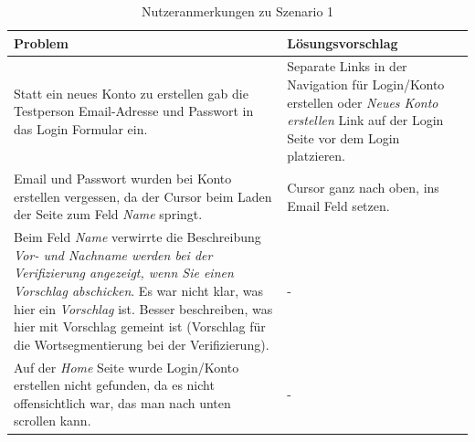 \begin{table}
	\centering
	\begin{tabular}{|p{}|p{}|}
		\hline
		\textbf{Problem} & \textbf{Lösungsvorschlag}\\
		\hline
		\hline
		Statt ein neues Konto zu erstellen gab die Testperson Email-Adresse und Passwort in das Login Formular ein. & Separate Links in der Navigation für Login/Konto erstellen oder \textit{Neues Konto erstellen} Link auf der Login Seite vor dem Login platzieren.\\
		\hline
		Email und Passwort wurden bei Konto erstellen vergessen, da der Cursor beim Laden der Seite zum Feld \textit{Name} springt. & Cursor ganz nach oben, ins Email Feld setzen.\\
		\hline
		Beim Feld \textit{Name} verwirrte die Beschreibung \textit{Vor- und Nachname werden bei der Verifizierung angezeigt, wenn Sie einen Vorschlag abschicken}. Es war nicht klar, was hier ein \textit{Vorschlag} ist.
		Besser beschreiben, was hier mit Vorschlag gemeint ist (Vorschlag für die Wortsegmentierung bei der Verifizierung). & -\\
		\hline
		Auf der \textit{Home} Seite wurde Login/Konto erstellen nicht gefunden, da es nicht offensichtlich war, das man nach unten scrollen kann. & -\\
		\hline
	\end{tabular}
	\caption{Nutzeranmerkungen zu Szenario 1}
	\label{table:szenario1}
\end{table}

